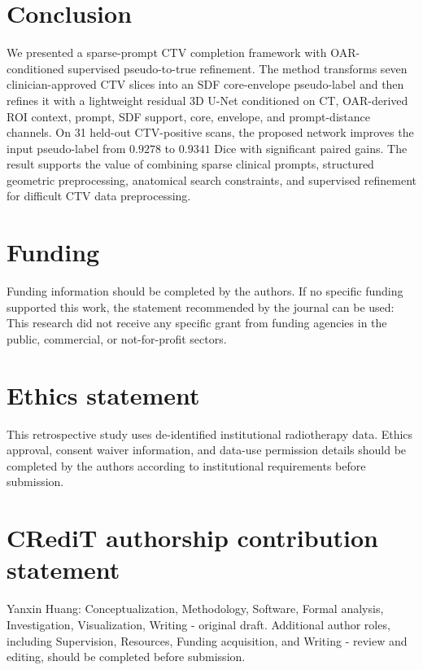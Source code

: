 \documentclass[preprint,12pt]{elsarticle}
\begin{document}
\section{Conclusion}

We presented a sparse-prompt CTV completion framework with OAR-conditioned supervised pseudo-to-true refinement. The method transforms seven clinician-approved CTV slices into an SDF core-envelope pseudo-label and then refines it with a lightweight residual 3D U-Net conditioned on CT, OAR-derived ROI context, prompt, SDF support, core, envelope, and prompt-distance channels. On 31 held-out CTV-positive scans, the proposed network improves the input pseudo-label from $0.9278$ to $0.9341$ Dice with significant paired gains. The result supports the value of combining sparse clinical prompts, structured geometric preprocessing, anatomical search constraints, and supervised refinement for difficult CTV data preprocessing.

\section*{Funding}

Funding information should be completed by the authors. If no specific funding supported this work, the statement recommended by the journal can be used: This research did not receive any specific grant from funding agencies in the public, commercial, or not-for-profit sectors.

\section*{Ethics statement}

This retrospective study uses de-identified institutional radiotherapy data. Ethics approval, consent waiver information, and data-use permission details should be completed by the authors according to institutional requirements before submission.

\section*{CRediT authorship contribution statement}

Yanxin Huang: Conceptualization, Methodology, Software, Formal analysis, Investigation, Visualization, Writing - original draft. Additional author roles, including Supervision, Resources, Funding acquisition, and Writing - review and editing, should be completed before submission.
\end{document}
